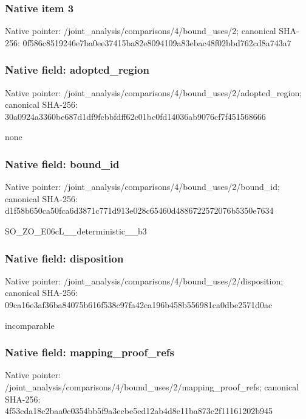 \documentclass[10pt,a4paper]{article}
\begin{document}
\subsubsection{Native item 3}


Native pointer: /joint\_analysis/comparis\allowbreak{}ons/4/bound\_uses/2; canonical SHA-256: 0f586c8519246e7ba0ee3741\allowbreak{}5ba82e8094109a83ebac48f0\allowbreak{}2bbd762cd8a743a7



\subsubsection{Native field: adopted\_region}


Native pointer: /joint\_analysis/comparis\allowbreak{}ons/4/bound\_uses/2/adopt\allowbreak{}ed\_region; canonical SHA-256: 30a0924a3360be687d1df9fc\allowbreak{}bbfdff62c01bc0fd14036ab9\allowbreak{}076cf7f451568666


none


\subsubsection{Native field: bound\_id}


Native pointer: /joint\_analysis/comparis\allowbreak{}ons/4/bound\_uses/2/bound\allowbreak{}\_id; canonical SHA-256: d1f58b650ca50fca6d3871c7\allowbreak{}71d913e028c65460d4886722\allowbreak{}572076b5350e7634


SO\_ZO\_E06cL\_\_deterministic\_\_b3


\subsubsection{Native field: disposition}


Native pointer: /joint\_analysis/comparis\allowbreak{}ons/4/bound\_uses/2/dispo\allowbreak{}sition; canonical SHA-256: 09ca16e3af36ba84075b616f\allowbreak{}538c97fa42ea196b458b5569\allowbreak{}81ca0dbe2571d0ac


incomparable


\subsubsection{Native field: mapping\_proof\_refs}


Native pointer: /joint\_analysis/comparis\allowbreak{}ons/4/bound\_uses/2/mappi\allowbreak{}ng\_proof\_refs; canonical SHA-256: 4f53cda18c2baa0c0354bb5f\allowbreak{}9a3ecbe5ed12ab4d8e11ba87\allowbreak{}3c2f11161202b945
\end{document}
